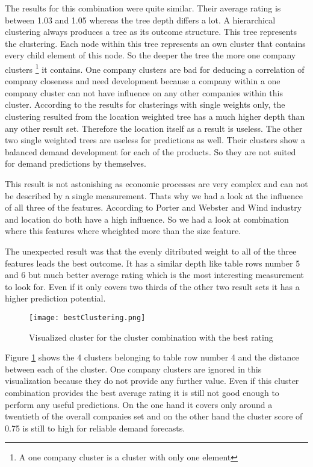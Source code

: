 The results for this combination were quite similar. Their average rating is between 1.03 and 1.05 whereas
the tree depth differs a lot. A hierarchical clustering always produces a tree as its outcome structure. This
tree represents the clustering. Each node within this tree represents an own cluster that contains every child element
of this node. So the deeper the tree the more one company clusters \footnote{A one company cluster is a cluster with only one element}
it contains. One company clusters are bad for deducing a correlation of company closeness and need development because
a company within a one company cluster can not have influence on any other companies within this cluster.
According to the results for clusterings with single weights only, the clustering resulted from the location weighted
tree has a much higher depth than any other result set. Therefore the location itself as a result is useless.
The other two single weighted trees are useless for predictions as well. Their clusters show a balanced demand
development for each of the products. So they are not suited for demand predictions by themselves.

This result is not astonishing as economic processes are very complex and can not be described by a single
measurement. Thats why we had a look at the influence of all three of the features. According to
Porter \cite{CompanyClusters} and Webster and Wind \cite{BusinessBuyingBehavior} industry and location
do both have a high influence. So we had a look at combination where this features where wheighted more than
the size feature.

The unexpected result was that the evenly ditributed weight to all of the three features leads the best outcome.
It has a similar depth like table rows number 5 and 6 but much better average rating which is the most interesting
measurement to look for. Even if it only covers two thirds of the other two result sets it has a higher prediction potential.

\begin{figure}[ht]
\texttt{[image: bestClustering.png]}
\centering
\caption{Visualized cluster for the cluster combination with the best rating}
\label{fig:bestClustering}
\end{figure}

Figure \ref{fig:bestClustering} shows the 4 clusters belonging to table row number 4 and the distance between each
of the cluster. One company clusters are ignored in this visualization because they do not provide any
further value. Even if this cluster combination provides the best average rating it is still not good enough
to perform any useful predictions. On the one hand it covers only around a twentieth of the overall companies set
and on the other hand the cluster score of 0.75 is still to high for reliable demand forecasts.

